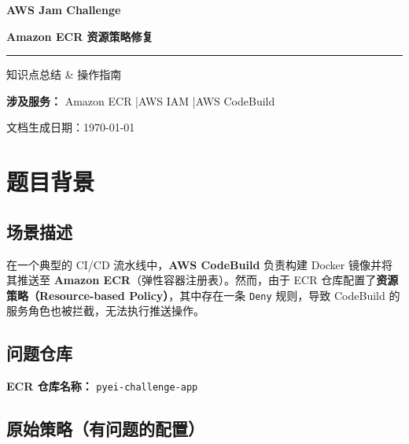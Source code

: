 \documentclass[12pt, a4paper]{article}
\begin{document}

\begin{titlepage}
  \centering
  \vspace*{3cm}
  {\fontsize{28}{36}\bfseries\color{awsorange} AWS Jam Challenge}\par
  \vspace{0.5cm}
  {\Large\bfseries\color{black} Amazon ECR 资源策略修复}\par
  \vspace{0.5cm}
  \rule{0.6\textwidth}{1.5pt}\par
  \vspace{1cm}
  {\large 知识点总结 \& 操作指南}\par
  \vspace{2cm}
  \begin{infobox}
    \centering
    \textbf{涉及服务：} Amazon ECR \quad|\quad AWS IAM \quad|\quad AWS CodeBuild
  \end{infobox}
  \vfill
  {\small 文档生成日期：\today}
\end{titlepage}

\tableofcontents
\newpage

\section{题目背景}

\subsection{场景描述}

在一个典型的 CI/CD 流水线中，\textbf{AWS CodeBuild} 负责构建 Docker 镜像并将其推送至 \textbf{Amazon ECR}（弹性容器注册表）。然而，由于 ECR 仓库配置了\textbf{资源策略（Resource-based Policy）}，其中存在一条 \texttt{Deny} 规则，导致 CodeBuild 的服务角色也被拦截，无法执行推送操作。

\subsection{问题仓库}

\begin{infobox}
  \textbf{ECR 仓库名称：} \texttt{pyei-challenge-app}
\end{infobox}

\subsection{原始策略（有问题的配置）}
\end{document}
